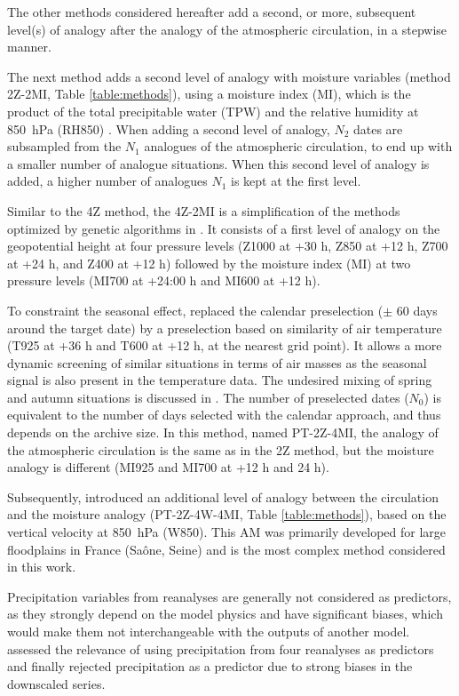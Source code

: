 \documentclass[smallextended]{svjour3}       %
\begin{document}
	The other methods considered hereafter add a second, or more, subsequent level(s) of analogy after the analogy of the atmospheric circulation, in a stepwise manner.
	
	The next method adds a second level of analogy with moisture variables (method 2Z-2MI, Table \ref{table:methods}), using a moisture index (MI), which is the product of the total precipitable water (TPW) and the relative humidity at 850~hPa (RH850) \citep{Bontron2004}. When adding a second level of analogy, $N_{2}$ dates are subsampled from the $N_{1}$ analogues of the atmospheric circulation, to end up with a smaller number of analogue situations. When this second level of analogy is added, a higher number of analogues $N_{1}$ is kept at the first level. 
	
	Similar to the 4Z method, the 4Z-2MI is a simplification of the methods optimized by genetic algorithms in \citet{Horton2017b}. It consists of a first level of analogy on the geopotential height at four pressure levels (Z1000 at +30 h, Z850 at +12 h, Z700 at +24 h, and Z400 at +12 h) followed by the moisture index (MI) at two pressure levels (MI700 at +24:00 h and MI600 at +12 h).
	
	To constraint the seasonal effect, \citet{BenDaoud2016} replaced the calendar preselection ($\pm$ 60 days around the target date) by a preselection based on similarity of air temperature (T925 at +36 h and T600 at +12 h, at the nearest grid point). It allows a more dynamic screening of similar situations in terms of air masses as the seasonal signal is also present in the temperature data. The undesired mixing of spring and autumn situations is discussed in \citet{Caillouet2016}. The number of preselected dates ($N_{0}$) is equivalent to the number of days selected with the calendar approach, and thus depends on the archive size. In this method, named PT-2Z-4MI, the analogy of the atmospheric circulation is the same as in the 2Z method, but the moisture analogy is different (MI925 and MI700 at +12 h and 24 h).
	
	Subsequently, \citet{BenDaoud2016} introduced an additional level of analogy between the circulation and the moisture analogy (PT-2Z-4W-4MI, Table \ref{table:methods}), based on the vertical velocity at 850~hPa (W850). This AM was primarily developed for large floodplains in France (Sa\^{o}ne, Seine) and is the most complex method considered in this work. 
	
	Precipitation variables from reanalyses are generally not considered as predictors, as they strongly depend on the model physics \citep{Rienecker2011} and have significant biases, which would make them not interchangeable with the outputs of another model. \citet{Dayon2015} assessed the relevance of using precipitation from four reanalyses as predictors and finally rejected precipitation as a predictor due to strong biases in the downscaled series.
	
\end{document}

